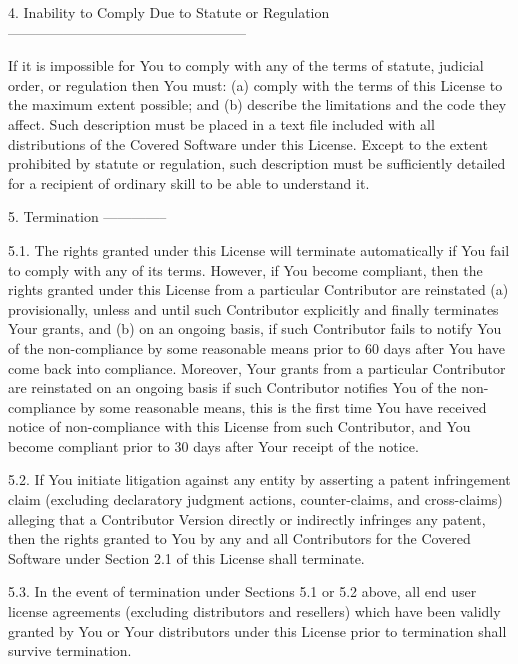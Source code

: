 \begin{DoxyVerb}
4. Inability to Comply Due to Statute or Regulation
---------------------------------------------------

If it is impossible for You to comply with any of the terms of
statute, judicial order, or regulation then You must: (a) comply with
the terms of this License to the maximum extent possible; and (b)
describe the limitations and the code they affect. Such description must
be placed in a text file included with all distributions of the Covered
Software under this License. Except to the extent prohibited by statute
or regulation, such description must be sufficiently detailed for a
recipient of ordinary skill to be able to understand it.

5. Termination
--------------

5.1. The rights granted under this License will terminate automatically
if You fail to comply with any of its terms. However, if You become
compliant, then the rights granted under this License from a particular
Contributor are reinstated (a) provisionally, unless and until such
Contributor explicitly and finally terminates Your grants, and (b) on an
ongoing basis, if such Contributor fails to notify You of the
non-compliance by some reasonable means prior to 60 days after You have
come back into compliance. Moreover, Your grants from a particular
Contributor are reinstated on an ongoing basis if such Contributor
notifies You of the non-compliance by some reasonable means, this is the
first time You have received notice of non-compliance with this License
from such Contributor, and You become compliant prior to 30 days after
Your receipt of the notice.

5.2. If You initiate litigation against any entity by asserting a patent
infringement claim (excluding declaratory judgment actions,
counter-claims, and cross-claims) alleging that a Contributor Version
directly or indirectly infringes any patent, then the rights granted to
You by any and all Contributors for the Covered Software under Section
2.1 of this License shall terminate.

5.3. In the event of termination under Sections 5.1 or 5.2 above, all
end user license agreements (excluding distributors and resellers) which
have been validly granted by You or Your distributors under this License
prior to termination shall survive termination.


\end{DoxyVerb}
